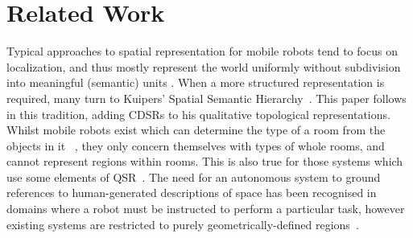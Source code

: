 \documentclass[letterpaper]{article}
\begin{document}
%
% 

\section{Related Work}


Typical approaches to spatial representation for mobile robots tend to focus on localization, and thus mostly represent the world uniformly without subdivision into meaningful (semantic) units \cite{Thrun02a}. When a more structured representation is required, many turn to Kuipers' Spatial Semantic Hierarchy~\cite{Kuipers:2000}. This paper follows in this tradition, adding CDSRs to his qualitative topological representations. Whilst mobile robots exist which can determine the type of a room from the objects in it ~\cite{Hanheide/etal:2010a,Galindo/etal:2005a}, they only concern themselves with types of whole rooms, and cannot represent regions within rooms. This is also true for those systems which use some elements of QSR~\cite{aydemir2011icra}. The need for an autonomous system to ground references to human-generated descriptions of space has been recognised in domains where a robot must be instructed to perform a particular task, however existing systems are restricted to purely geometrically-defined regions~\cite{Tellex:2011,Dzifcak/etal:2009,brenneretal07ijcai}.
\end{document}
